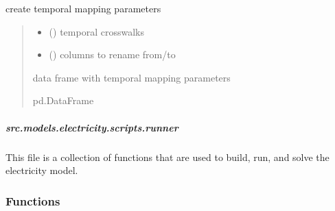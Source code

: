\documentclass[letterpaper,10pt,english]{sphinxmanual}
\begin{document}
\begin{fulllineitems}
\label{\detokenize{src.models.electricity.scripts.preprocessor:src.models.electricity.scripts.preprocessor.time_map}}
\pysigstartsignatures
\pysiglinewithargsret
{}
{\sphinxparamcomma {}}
{}
\pysigstopsignatures
\sphinxAtStartPar
create temporal mapping parameters
\begin{quote}\begin{description}
\begin{itemize}
\item {} 
\sphinxAtStartPar
{} () \textendash{} temporal crosswalks

\item {} 
\sphinxAtStartPar
{} () \textendash{} columns to rename from/to

\end{itemize}

\sphinxAtStartPar
data frame with temporal mapping parameters

\sphinxAtStartPar
pd.DataFrame

\end{description}\end{quote}

\end{fulllineitems}


\sphinxstepscope


\subparagraph{src.models.electricity.scripts.runner}
\label{\detokenize{src.models.electricity.scripts.runner:module-src.models.electricity.scripts.runner}}\label{\detokenize{src.models.electricity.scripts.runner:src-models-electricity-scripts-runner}}\label{\detokenize{src.models.electricity.scripts.runner::doc}}
\sphinxAtStartPar
This file is a collection of functions that are used to build, run, and solve the electricity model.
\subsubsection*{Functions}
\end{document}
